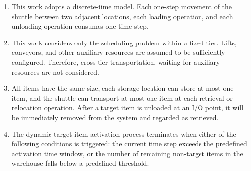 \begin{enumerate}
    \item This work adopts a discrete-time model. Each one-step movement of the shuttle between two adjacent locations, each loading operation, and each unloading operation consumes one time step.
    
    \item This work considers only the scheduling problem within a fixed tier. Lifts, conveyors, and other auxiliary resources are assumed to be sufficiently configured. Therefore, cross-tier transportation, waiting for auxiliary resources are not considered.
    
    \item All items have the same size, each storage location can store at most one item, and the shuttle can transport at most one item at each retrieval or relocation operation. After a target item is unloaded at an I/O point, it will be immediately removed from the system and regarded as retrieved.
    
    \item The dynamic target item activation process terminates when either of the following conditions is triggered: the current time step exceeds the predefined activation time window, or the number of remaining non-target items in the warehouse falls below a predefined threshold.
\end{enumerate}

